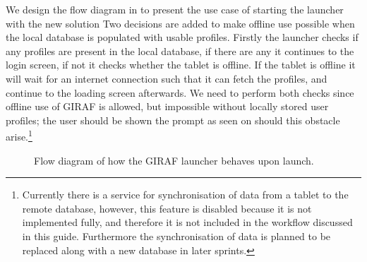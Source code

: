 We design the flow diagram in  to present the use case of starting the launcher with the new solution
Two decisions are added to make offline use possible when the local database is populated with usable profiles.
Firstly the launcher checks if any profiles are present in the local database, if there are any it continues to the login screen, if not it checks whether the tablet is offline. 
If the tablet is offline it will wait for an internet connection such that it can fetch the profiles, and continue to the loading screen afterwards.
We need to perform both checks since offline use of GIRAF is allowed, but impossible without locally stored user profiles; the user should be shown the prompt as seen on  should this obstacle arise.\footnote{Currently there is a service for synchronisation of data from a tablet to the remote database, however, this feature is disabled because it is not implemented fully, and therefore it is not included in the workflow discussed in this guide. Furthermore the synchronisation of data is planned to be replaced along with a new database in later sprints.}

\begin{figure}[h]
    \centering
    
    \caption{Flow diagram of how the GIRAF launcher behaves upon launch.}\label{fig:launcher_offline_flow}
\end{figure}

